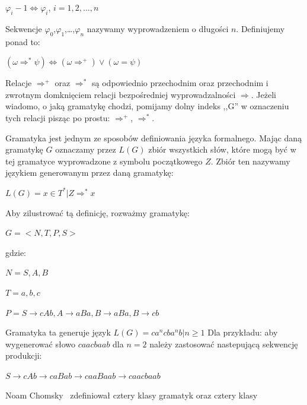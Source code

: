\begin{description}
\begin{description}
   \item $\varphi_i-1 \Longleftrightarrow \varphi_i$,  $i = 1,2,\ldots,n$
  \end{description}
Sekwencje $\varphi_0$,$\varphi_1$,\ldots,$\varphi_n$ nazywamy wyprowadzeniem o
długości $n$.
Definiujemy ponad to:
  \begin{description}
   \item
$(\omega\Longrightarrow^*\psi)\Longleftrightarrow(\omega\Longrightarrow^+)\vee(\omega=\psi)$
  \end{description}
Relacje $\Longrightarrow^+$ oraz $\Longrightarrow^*$ są odpowiednio przechodnim
oraz przechodnim i zwrotnym domknięciem relacji bezpośredniej wyprowadzalności
$\Longrightarrow$. Jeżeli wiadomo, o jaką gramatykę chodzi, pomijamy dolny
indeks ,,G'' w oznaczeniu tych relacji pisząc po prostu: $\Longrightarrow^+$,
$\Longrightarrow^*$.
 \item[Jezyk.] Gramatyka jest jednym ze sposobów definiowania języka formalnego.
Mając daną gramatykę $G$ oznaczamy przez $L(G)$ zbiór wszystkich słów, które
mogą być w tej gramatyce wyprowadzone z symbolu początkowego $Z$. Zbiór ten
nazywamy językiem generowanym przez daną gramatykę:
  \begin{description}
   \item $L(G)={x\in T^*|Z\Longrightarrow^*x}$
  \end{description}
Aby zilustrować tą definicję, rozważmy gramatykę:
  \begin{description}
   \item $G=<N,T,P,S>$
  \end{description}
gdzie:
  \begin{description}
   \item $N={S,A,B}$
   \item $T={a,b,c}$
   \item $P={S\longrightarrow cAb, A\longrightarrow aBa, B\longrightarrow aBa,
B\longrightarrow cb}$
  \end{description}
Gramatyka ta generuje język $L(G)={ca^ncba^nb|n\geq 1}$
Dla przykładu: aby wygenerować słowo $caacbaab$ dla $n=2$ należy zastosować
nastepującą sekwencję produkcji:
  \begin{description}
   \item $S\longrightarrow cAb\longrightarrow caBab\longrightarrow
caaBaab\longrightarrow caacbaab$
  \end{description}
\end{description}
Noam Chomsky~\cite{chomsky} zdefiniował cztery klasy gramatyk oraz cztery klasy
